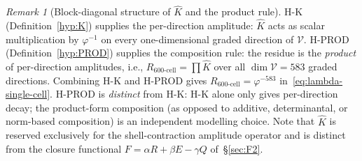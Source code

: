 \documentclass[12pt]{article}
\theoremstyle{definition}
\theoremstyle{remark}
\newtheorem{remark}[theorem]{Remark}
\newcommand{\Vcal}{\mathcal{V}}
\begin{document}
\begin{remark}[Block-diagonal structure of $\widehat{K}$ and the product rule]\label{rem:F4-diagonal}
H-K (Definition~\ref{hyp:K}) supplies the per-direction amplitude: $\widehat{K}$ acts as scalar multiplication by $\varphi^{-1}$ on every one-dimensional graded direction of $\Vcal$. H-PROD (Definition~\ref{hyp:PROD}) supplies the composition rule: the residue is the \emph{product} of per-direction amplitudes, i.e., $R_{600\text{-cell}} = \prod \widehat{K}$ over all $\dim \Vcal = 583$ graded directions. Combining H-K and H-PROD gives $R_{600\text{-cell}} = \varphi^{-583}$ in~\eqref{eq:lambda-single-cell}. H-PROD is \emph{distinct} from H-K: H-K alone only gives per-direction decay; the product-form composition (as opposed to additive, determinantal, or norm-based composition) is an independent modelling choice. Note that $\widehat{K}$ is reserved exclusively for the shell-contraction amplitude operator and is distinct from the closure functional $F = \alpha R + \beta E - \gamma Q$ of~\S\ref{sec:F2}.
\end{remark}
\end{document}
